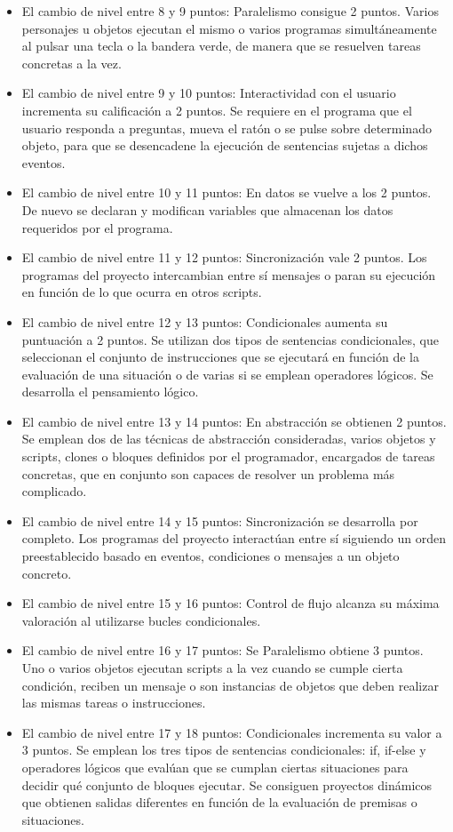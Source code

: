 \documentclass[a4paper, 12pt]{book}
\begin{document}
\begin{itemize}
 \item El cambio de nivel entre 8 y 9 puntos: Paralelismo consigue 2 puntos. Varios personajes u objetos ejecutan el mismo o varios programas simultáneamente al pulsar una tecla o la bandera verde, de manera que se resuelven tareas concretas a la vez.
 \item El cambio de nivel entre 9 y 10 puntos: Interactividad con el usuario incrementa su calificación a 2 puntos. Se requiere en el programa que el usuario responda a preguntas, mueva el ratón o se pulse sobre determinado objeto, para que se desencadene la ejecución de sentencias sujetas a dichos eventos.
 \item El cambio de nivel entre 10 y 11 puntos: En datos se vuelve a los 2 puntos. De nuevo se declaran y modifican variables que almacenan los datos requeridos por el programa.
 \item El cambio de nivel entre 11 y 12 puntos: Sincronización vale 2 puntos. Los programas del proyecto intercambian entre sí mensajes o paran su ejecución en función de lo que ocurra en otros scripts.
 \item El cambio de nivel entre 12 y 13 puntos: Condicionales aumenta su puntuación a 2 puntos. Se utilizan dos tipos de sentencias condicionales, que seleccionan el conjunto de instrucciones que se ejecutará en función de la evaluación de una situación o de varias si se emplean operadores lógicos. Se desarrolla el pensamiento lógico.
 \item El cambio de nivel entre 13 y 14 puntos: En abstracción se obtienen 2 puntos. Se emplean dos de las técnicas de abstracción consideradas, varios objetos y scripts, clones o bloques definidos por el programador, encargados de tareas concretas, que en conjunto son capaces de resolver un problema más complicado.
 \item El cambio de nivel entre 14 y 15 puntos: Sincronización se desarrolla por completo. Los programas del proyecto interactúan entre sí siguiendo un orden preestablecido basado en eventos, condiciones o  mensajes a un objeto concreto. 
 \item El cambio de nivel entre 15 y 16 puntos: Control de flujo alcanza su máxima valoración al utilizarse bucles condicionales.
 \item El cambio de nivel entre 16 y 17 puntos: Se Paralelismo obtiene 3 puntos. Uno o varios objetos ejecutan scripts a la vez cuando se cumple cierta condición, reciben un mensaje o son instancias de objetos que deben realizar las mismas tareas o instrucciones.
 \item El cambio de nivel entre 17 y 18 puntos: Condicionales incrementa su valor a 3 puntos. Se emplean los tres tipos de sentencias condicionales: if, if-else y operadores lógicos que evalúan que se cumplan ciertas situaciones para decidir qué conjunto de bloques ejecutar. Se consiguen proyectos dinámicos que obtienen salidas diferentes en función de la evaluación de premisas o situaciones.

\end{itemize}
\end{document}
